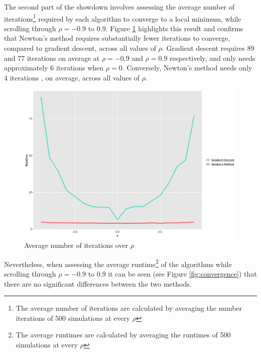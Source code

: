 \documentclass[12pt, authoryear]{elsarticle}
\begin{document}
The second part of the showdown involves assessing the average number of iterations\footnote{The average number of iterations are calculated by averaging the number iterations of 500 simulations at every $\rho$} required by each algorithm to converge to a local minimum, while scrolling through $\rho = -0.9$ to $0.9$. Figure \ref{fig:iterations} highlights this result and confirms that Newton's method requires substantially fewer iterations to converge, compared to gradient descent, across all values of $\rho$. Gradient descent requires 89 and 77 iterations on average at $\rho = -0.9$ and $\rho = 0.9$ respectively, and only needs approximately 6 iterations when $\rho = 0$. Conversely, Newton's method needs only 4 iterations , on average, across all values of $\rho$. 

\begin{figure}[H]
	\centering
	\includegraphics[clip, angle=0, width=13cm]{images/iterations.png}
	\caption{Average number of iterations over $\rho$}
	\label{fig:iterations}
\end{figure}

Nevertheless, when assessing the average runtime\footnote{The average runtimes are calculated by averaging the runtimes of 500 simulations at every $\rho$}  of the algorithms while scrolling through $\rho = -0.9$ to $0.9$ it can be seen (see Figure \ref{fig:convergence}) that there are no significant differences between the two methods.
\end{document}

